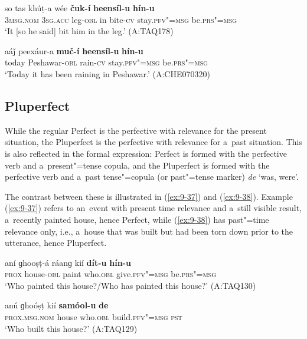 \begin{exe}
\ex
\label{ex:9-35}
\gll so tas khúṭ-a wée \textbf{čuk-í} \textbf{heensíl-u} \textbf{hín-u} \\
\textsc{3msg.nom} \textsc{3sg.acc} leg-\textsc{obl} in bite-\textsc{cv} stay.\textsc{pfv"=msg} be.\textsc{prs"=msg} \\
\glt `It [so he said] bit him in the leg.' (A:TAQ178)

\ex
\label{ex:9-36}
\gll aáǰ peexáur-a \textbf{muč-í} \textbf{heensíl-u} \textbf{hín-u}  \\
today Peshawar-\textsc{obl} rain-\textsc{cv} stay.\textsc{pfv"=msg} be.\textsc{prs"=msg} \\
\glt `Today it has been raining in Peshawar.' (A:CHE070320)
\end{exe}

\subsection{Pluperfect}
\label{subsec:9-1-8}

While the regular Perfect is the perfective with relevance for the present situation, the Pluperfect is the perfective with relevance for a~past situation. This is also reflected in the formal expression: Perfect is formed with the perfective verb and a~present"=tense copula, and the Pluperfect is formed with the perfective verb and a~past tense"=copula (or past"=tense marker) \textit{de} `was, were'. 


The contrast between these is illustrated in (\ref{ex:9-37}) and (\ref{ex:9-38}). Example (\ref{ex:9-37}) refers to an~event with present time relevance and a~still visible result, a~recently painted house, hence Perfect, while (\ref{ex:9-38}) has past"=time relevance only, i.e., a~house that was built but had been torn down prior to the utterance, hence Pluperfect.

\begin{exe}
\ex
\label{ex:9-37}
\gll aní ɡhooṣṭ-á ráanɡ kií \textbf{dít-u} \textbf{hín-u}  \\
\textsc{prox} house-\textsc{obl} paint who.\textsc{obl} give.\textsc{pfv"=msg} be.\textsc{prs"=msg} \\
\glt `Who painted this house?/Who has painted this house?' (A:TAQ130)

\ex
\label{ex:9-38}
\gll anú ɡhoóṣṭ kií \textbf{samóol-u} \textbf{de} \\
\textsc{prox.msg.nom} house who.\textsc{obl} build.\textsc{pfv"=msg} \textsc{pst} \\
\glt `Who built this house?' (A:TAQ129)
\end{exe}

